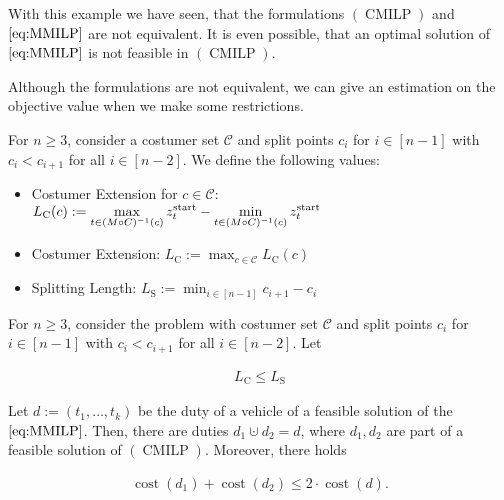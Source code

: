 With this example we have seen, that the formulations $(\operatorname{CMILP})$ and $\eqref{eq:MMILP}$ are not equivalent. It is even possible, that an optimal solution of $\eqref{eq:MMILP}$ is not feasible in $(\operatorname{CMILP})$.

Although the formulations are not equivalent, we can give an estimation on the objective value when we make some restrictions.

\begin{definition}

For $n\geq 3$, consider a costumer set $\mathcal{C}$ and split points $c_i$ for $i\in[n-1]$ with $c_i<c_{i+1}$ for all $i\in[n-2]$. We define the following values:

\begin{itemize}
	\item{Costumer Extension for $c\in\mathcal{C}$: $\displaystyle{L_{\operatorname{C}}(c) := \max_{t\in(M\circ C)^{-1}(c)}z^{\operatorname{start}}_t - \min_{t\in(M\circ C)^{-1}(c)}z^{\operatorname{start}}_t}$}
	\item{Costumer Extension: $\displaystyle{L_{\operatorname{C}} := \max_{c\in\mathcal{C}} L_{\operatorname{C}}(c)}$}
	\item{Splitting Length: $\displaystyle{L_{\operatorname{S}} := \min_{i\in[n-1]} c_{i+1}-c_i}$}
\end{itemize}

\end{definition}

\begin{theorem}

For $n\geq 3$, consider the problem with costumer set $\mathcal{C}$ and split points $c_i$ for $i\in[n-1]$ with $c_i<c_{i+1}$ for all $i\in[n-2]$. Let

\begin{align}
\label{eq:LCLS}
	L_{\operatorname{C}}\leq L_{\operatorname{S}}
\end{align}

Let $d:=\left(t_1,\dots,t_k\right)$ be the duty of a vehicle of a feasible solution of the $\eqref{eq:MMILP}$. Then, there are duties $d_1\cupdot d_2=d$, where $d_1,d_2$ are part of a feasible solution of $(\operatorname{CMILP})$. Moreover, there holds

\begin{align}
	\operatorname{cost}\left(d_1\right)+\operatorname{cost}\left(d_2\right)\leq 2\cdot\operatorname{cost}\left(d\right).
\end{align}

\end{theorem}

